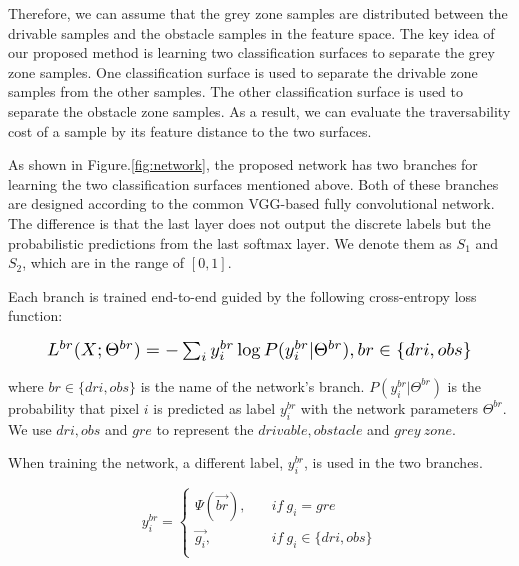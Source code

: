 \documentclass[letterpaper, 10 pt, conference]{ieeeconf}  %
\begin{document}
Therefore, we can assume that the grey zone samples are distributed between the drivable samples and the obstacle samples in the feature space. 
The key idea of our proposed method is learning two classification surfaces to separate the grey zone samples. One classification surface is used to separate the drivable zone samples from the other samples. The other classification surface is used to separate the obstacle zone samples. As a result, we can evaluate the traversability cost of a sample by its feature distance to the two surfaces.                                                                                                                                                                                                                                 

As shown in Figure.\ref{fig:network}, the proposed network has two branches for learning the two classification surfaces mentioned above. Both of these branches are designed according to the common VGG-based fully convolutional network. The difference is that the last layer does not output the discrete labels but the probabilistic predictions from the last softmax layer. We denote them as $S_1$ and $S_2$, which are in the range of $[0,1]$.

Each branch is trained end-to-end guided by the following cross-entropy loss function:

\vspace{-3mm}
\begin{equation}
\label{equ:loss0}
\resizebox{.91\hsize}{!}{
	$L^{br}(X;\Theta^{br})=-\sum_{i}{y_i^{br} \log{P(y_i^{br}|\Theta^{br})}}, br \in \{dri, obs\}$
}
\end{equation}

where $br\in\{dri, obs\}$ is the name of the network's branch. $P(y_i^{br}|\Theta^{br})$ is the probability that  pixel $i$ is predicted as label $y_i^{br}$ with the network parameters $\Theta^{br}$. We use $dri,obs$ and $gre$ to represent the $drivable, obstacle$ and $grey\ zone$.

When training the network, a different label, $y_i^{br}$, is used in the two branches. 

\begin{equation}
y_i^{br}= 
\left\{
\begin{array}{ll}
\Psi(\vec{br}), &\quad if \ g_i = gre \\ 
\vec{g_i}, &\quad if \ g_i \in \{dri,obs \} \\
\end{array}
\right.
\end{equation}
\end{document}
